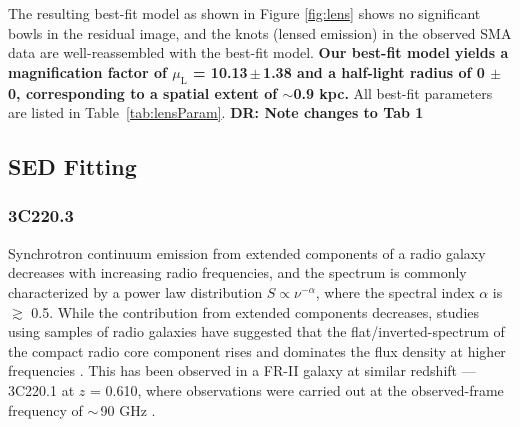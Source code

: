 \documentclass[iop]{emulateapj}
\newcommand{\Msun}{\mbox{$M_{\odot}$}}
\begin{document}
The resulting best-fit model as shown in Figure\,\,\ref{fig:lens} shows no significant bowls in the residual
image, and the knots (lensed emission) in the observed SMA data are well-reassembled with the best-fit model.
{\bf  Our best-fit model yields a magnification
factor of $\mu_\textrm{L}$ = 10.13\,$\pm$\,1.38
and a half-light radius of 0 $\pm$ 0, corresponding to a spatial extent of $\sim$0.9 kpc.} 
All best-fit
parameters are listed in Table~\ref{tab:lensParam}. {\bf DR: Note changes to Tab 1}


\subsection{SED Fitting} \label{sec:SED}
\subsubsection{3C220.3}\label{sec:SEDFg}
Synchrotron continuum emission from extended components of a radio galaxy decreases with increasing radio frequencies,
and the spectrum is commonly characterized by a power law distribution $S \propto \nu^{-\alpha}$, where the
spectral index $\alpha$ is $\gtrsim$ 0.5. While the contribution from extended components decreases, studies using
samples of radio galaxies have suggested that the flat/inverted-spectrum of the compact radio core component rises
and dominates the flux density at higher frequencies \citep{Kellermann81a,Begelman84a}. This has been observed in a FR-II galaxy at similar redshift --- 3C220.1 at $z$ = 0.610, where observations were carried out at the observed-frame frequency of $\sim$\,90 GHz \citep{Hardcastle08a}.
\end{document}
